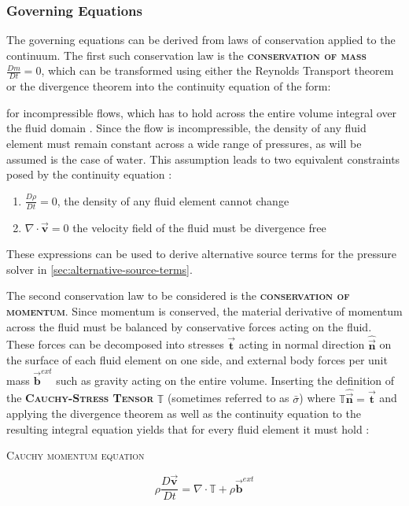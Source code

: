 \documentclass[oneside, a4paper]{book}
\newcommand\emphasis[1]{{\scshape\bfseries#1}}
\newcommand{\equationnamed}[2]{%
  \setlength{\fboxsep}{2pt} %
  \setlength{\fboxrule}{0.01pt}
  \begin{center}
    \begin{minipage}{\textwidth}
      \begin{center}\textsc{#1}\end{center}
      #2
    \end{minipage}
  \end{center}
}
\newcommand{\equationnamedbox}[2]{%
  \setlength{\fboxsep}{5pt} %
  \setlength{\fboxrule}{0.01pt}
  \begin{center}
    \fbox{
      \begin{minipage}{0.4\textwidth}
        \begin{center}\emphasis{#1}\end{center}
        #2
      \end{minipage}
    }
  \end{center}
}
\newcommand\vek[1]{\vec{\bm{#1}}}
\newcommand\mat[1]{{\mathds{#1}}}
\newcommand\br[1]{\left(#1\right)}
\newcommand\divergence{{\nabla\cdot}}
\begin{document}
    \subsubsection{Governing Equations}
    The governing equations can be derived from laws of conservation applied to the continuum. The first such conservation law is the \emphasis{conservation of mass} $\frac{Dm}{Dt}=0$, which can be transformed using either the Reynolds Transport theorem or the divergence theorem \autocite{labcourse} into the continuity equation of the form:
    \equationnamedbox{Continuity Equation}{
      \begin{equation}\label{eq:continuity}
        \frac{D\rho}{Dt} +\rho\br{\divergence \vek{v}} = 0
      \end{equation}
    }
    for incompressible flows, which has to hold across the entire volume integral over the fluid domain \autocite{anderson}. Since the flow is incompressible, the density of any fluid element must remain constant across a wide range of pressures, as will be assumed is the case of water. This assumption leads to two equivalent constraints posed by the continuity equation \autocite{continuum-intro}: 
    \begin{enumerate}
      \item $\frac{D\rho}{Dt}=0$, the density of any fluid element cannot change \label{enum:continuity-equation-constraint-den}
      \item $\divergence\vek{v}=0$ the velocity field of the fluid must be divergence free \label{enum:continuity-equation-constraint-vel}
    \end{enumerate}
    These expressions can be used to derive alternative source terms for the pressure solver in \autoref{sec:alternative-source-terms}.


    The second conservation law to be considered is the \emphasis{conservation of momentum}. Since momentum is conserved, the material derivative of momentum across the fluid must be balanced by conservative forces acting on the fluid. These forces can be decomposed into stresses $\vek{t}$ acting in normal direction $\hat{\vek{n}}$ on the surface of each fluid element on one side, and external body forces per unit mass $\vek{b}^{ext}$ such as gravity acting on the entire volume. Inserting the definition of the \emphasis{Cauchy-Stress Tensor} $\mat{T}$ (sometimes referred to as $\bar\sigma$) where $\mat{T}\hat{\vek{n}}=\vek{t}$ and applying the divergence theorem as well as the continuity equation to the resulting integral equation yields that for every fluid element it must hold \autocite{continuum-intro}:
    \equationnamed{Cauchy momentum equation}{
      \begin{equation}
        \rho\frac{D\vek{v}}{Dt} = \divergence\mat{T} + \rho\vek{b}^{ext}
      \end{equation}
      }
\end{document}
